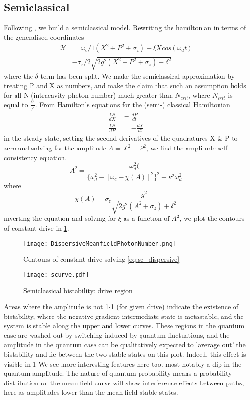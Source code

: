 \subsection{Semiclassical}
Following \cite{Bishop2010}, we build a semiclassical model.
Rewriting the hamiltonian in terms of the generalised coordinates
\begin{align}
        \mathscr{H} &= \omega_c/1 (X^2 + P^2 + \sigma_z) + \xi X cos(\omega_d t)\\
                    & - \sigma_z /2 \sqrt{2g^2(X^2+P^2+\sigma_z) + \delta^2}
\end{align}
where the $\delta$ term has been split. We make the semiclassical approximation by treating P and X as numbers, and make the claim that such an assumption holds for all N (intracavity photon number) much greater than $N_{crit}$, where $N_{crit}$ is equal to $\frac{\delta^2}{g^2}$.
From Hamilton's equations for the (semi-) classical Hamiltonian
\begin{align}
        \frac{d\mathscr{H}}{dX} &= \frac{dP}{dt}\\
        \frac{d\mathscr{H}}{dP} &= -\frac{dX}{dt}
\end{align}
in the steady state, setting the second derivatives of the quadratures X \& P to zero and solving for the amplitude $A = X^2 + P^2$, we find the amplitude self consistency equation.
\begin{equation}
        A^2 = \frac{\omega_d^2\xi}{\{\omega_d^2 - [\omega_c - \chi (A) ]^2 \}^2+ \kappa^2 \omega_d^2}
\end{equation}
where
\begin{equation}
        \chi(A) = \sigma_z \frac{g^2}{\sqrt{2g^2(A^2 + \sigma_z) + \delta^2}}
        \label{eq:sc_dispersive}
\end{equation}
inverting the equation and solving for $\xi$ as a function of $A^2$, we plot the contours of constant drive in \cref{fig:sc_dispersive}.

\begin{figure}
  \texttt{[image: DispersiveMeanfieldPhotonNumber.png]}
  \caption{Contours of constant drive solving \cref{eq:sc_dispersive}}
  \label{fig:sc_dispersive}
\end{figure}
\begin{figure}
  \texttt{[image: scurve.pdf]}  
  \caption{Semiclassical bistability: drive region}
\end{figure}
Areas where the amplitude is not 1-1 (for given drive) indicate the existence of bistability, where the negative gradient intermediate state is metastable, and the system is stable along the upper and lower curves.
These regions in the quantum case are washed out by switching induced by quantum fluctuations, and the amplitude in the quantum case can be qualitatively expected to 'average out' the bistability and lie between the two stable states on this plot.
Indeed, this effect is visible in \cref{fig:sc_dispersive}
We see more interesting features here too, most notably a dip in the quantum amplitude. The nature of quantum probability means a probability distribution on the mean field curve will show interference effects between paths, here as amplitudes lower than the mean-field stable states.

